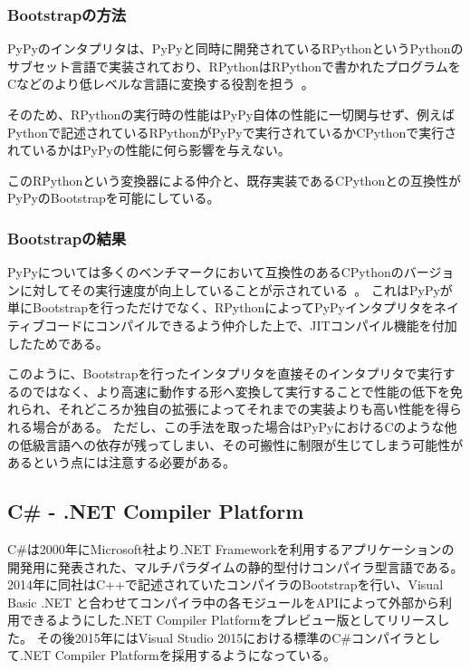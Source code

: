 \subsubsection{Bootstrapの方法}

PyPyのインタプリタは、PyPyと同時に開発されているRPythonというPythonのサブセット言語で実装されており、RPythonはRPythonで書かれたプログラムをCなどのより低レベルな言語に変換する役割を担う~\cite{rpython-doc}。

そのため、RPythonの実行時の性能はPyPy自体の性能に一切関与せず、例えばPythonで記述されているRPythonがPyPyで実行されているかCPythonで実行されているかはPyPyの性能に何ら影響を与えない。

このRPythonという変換器による仲介と、既存実装であるCPythonとの互換性がPyPyのBootstrapを可能にしている。


\subsubsection{Bootstrapの結果}

PyPyについては多くのベンチマークにおいて互換性のあるCPythonのバージョンに対してその実行速度が向上していることが示されている~\cite{speed-pypy-org}。
これはPyPyが単にBootstrapを行っただけでなく、RPythonによってPyPyインタプリタをネイティブコードにコンパイルできるよう仲介した上で、JITコンパイル機能を付加したためである。

このように、Bootstrapを行ったインタプリタを直接そのインタプリタで実行するのではなく、より高速に動作する形へ変換して実行することで性能の低下を免れられ、それどころか独自の拡張によってそれまでの実装よりも高い性能を得られる場合がある。
ただし、この手法を取った場合はPyPyにおけるCのような他の低級言語への依存が残ってしまい、その可搬性に制限が生じてしまう可能性があるという点には注意する必要がある。


\subsection{C\# - .NET Compiler Platform}
\label{side-effect:instance:csharp}

C\#は2000年にMicrosoft社より.NET Frameworkを利用するアプリケーションの開発用に発表された、マルチパラダイムの静的型付けコンパイラ型言語である。
2014年に同社はC++で記述されていたコンパイラのBootstrapを行い、Visual Basic .NET と合わせてコンパイラ中の各モジュールをAPIによって外部から利用できるようにした.NET Compiler Platformをプレビュー版としてリリースした。
その後2015年にはVisual Studio 2015における標準のC\#コンパイラとして.NET Compiler Platformを採用するようになっている。~\cite{roslyn}

